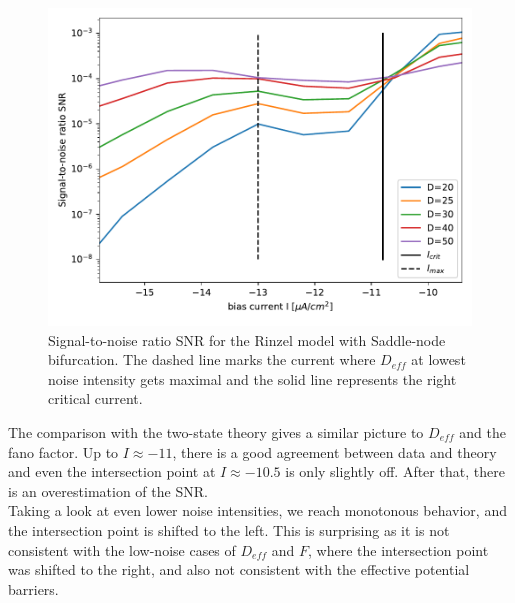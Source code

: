 \documentclass[12pt,a4paper]{article}
\begin{document}
\begin{figure}[H]
	\centering
	\includegraphics[scale=0.95]{snrinzelonlycritmax.pdf}\caption{Signal-to-noise ratio SNR for the Rinzel model with Saddle-node bifurcation. The dashed line marks the current where $D_{eff}$ at lowest noise intensity gets maximal and the solid line represents the right critical current.}
	\label{specrinzel}
\end{figure}
The comparison with the two-state theory gives a similar picture to $D_{eff}$ and the fano factor. Up to $I\approx-11$, there is a good agreement between data and theory and even the intersection point at $I\approx-10.5$ is only slightly off. After that, there is an overestimation of the SNR.  
\\
Taking a look at even lower noise intensities, we reach monotonous behavior, and the intersection point is shifted to the left. This is surprising as it is not consistent with the low-noise cases of $D_{eff}$ and $F$, where the intersection point was shifted to the right, and also not consistent with the effective potential barriers.
\end{document}
